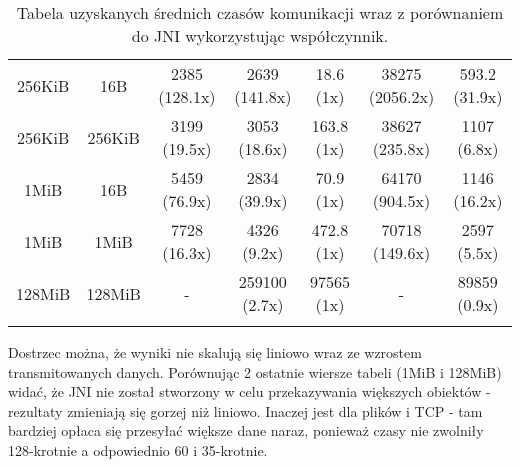 \begin{longtable}{|c|c|c|c|c|c|c|}
    256KiB & 16B & 2385 (128.1x) & 2639 (141.8x) & 18.6 (1x) & 38275 (2056.2x) & 593.2 (31.9x) \\
    256KiB & 256KiB & 3199 (19.5x) & 3053 (18.6x) & 163.8 (1x) & 38627 (235.8x) & 1107 (6.8x) \\
    1MiB & 16B & 5459 (76.9x) & 2834 (39.9x) & 70.9 (1x) & 64170 (904.5x) & 1146 (16.2x) \\
    1MiB & 1MiB & 7728 (16.3x) & 4326 (9.2x) & 472.8 (1x) & 70718 (149.6x) & 2597 (5.5x) \\
    128MiB & 128MiB & - & 259100 (2.7x) & 97565 (1x) & - & 89859 (0.9x) \\
    \hline
    \caption{Tabela uzyskanych średnich czasów komunikacji wraz z porównaniem do JNI wykorzystując współczynnik.}
    \label{tab:all_results}
\end{longtable}


Dostrzec można, że wyniki nie skalują się liniowo wraz ze wzrostem transmitowanych danych. Porównując 2 ostatnie wiersze tabeli (1MiB i 128MiB) widać, że JNI nie został stworzony w celu przekazywania większych obiektów - rezultaty zmieniają się gorzej niż liniowo. Inaczej jest dla plików i TCP - tam bardziej opłaca się przesyłać większe dane naraz, ponieważ czasy nie zwolniły 128-krotnie a odpowiednio 60 i 35-krotnie.

